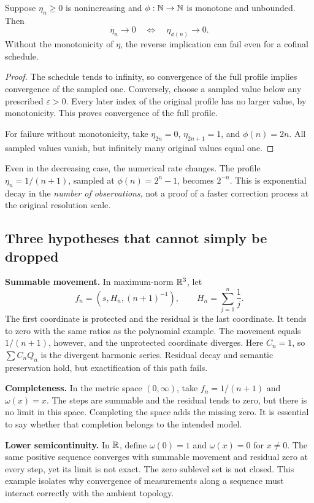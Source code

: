 \begin{proposition}\label{KS75}
Suppose \(\eta_n\ge0\) is nonincreasing and \(\phi:\mathbb N\to\mathbb N\) is monotone and unbounded. Then
\[
 \eta_n\to0\quad\Longleftrightarrow\quad\eta_{\phi(n)}\to0.
\]
Without the monotonicity of \(\eta\), the reverse implication can fail even for a cofinal schedule.
\end{proposition}
\begin{proof}
The schedule tends to infinity, so convergence of the full profile implies convergence of the sampled one. Conversely, choose a sampled value below any prescribed \(\varepsilon>0\). Every later index of the original profile has no larger value, by monotonicity. This proves convergence of the full profile.

For failure without monotonicity, take \(\eta_{2n}=0\), \(\eta_{2n+1}=1\), and \(\phi(n)=2n\). All sampled values vanish, but infinitely many original values equal one.
\end{proof}
Even in the decreasing case, the numerical rate changes. The profile \(\eta_n=1/(n+1)\), sampled at \(\phi(n)=2^n-1\), becomes \(2^{-n}\). This is exponential decay in the \emph{number of observations}, not a proof of a faster correction process at the original resolution scale.

\subsection{Three hypotheses that cannot simply be dropped}
\textbf{Summable movement.} In maximum-norm \(\mathbb R^3\), let
\[
 f_n=(s,H_n,(n+1)^{-1}),\qquad
 H_n=\sum_{j=1}^{n}\frac1j.
\]
The first coordinate is protected and the residual is the last coordinate. It tends to zero with the same ratios as the polynomial example. The movement equals \(1/(n+1)\), however, and the unprotected coordinate diverges. Here \(C_n=1\), so \(\sum C_nQ_n\) is the divergent harmonic series. Residual decay and semantic preservation hold, but exactification of this path fails.

\textbf{Completeness.} In the metric space \((0,\infty)\), take \(f_n=1/(n+1)\) and \(\omega(x)=x\). The steps are summable and the residual tends to zero, but there is no limit in this space. Completing the space adds the missing zero. It is essential to say whether that completion belongs to the intended model.

\textbf{Lower semicontinuity.} In \(\mathbb R\), define \(\omega(0)=1\) and \(\omega(x)=0\) for \(x\ne0\). The same positive sequence converges with summable movement and residual zero at every step, yet its limit is not exact. The zero sublevel set is not closed. This example isolates why convergence of measurements along a sequence must interact correctly with the ambient topology.
